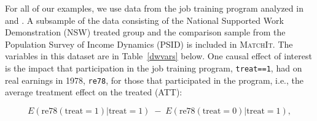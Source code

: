 \documentclass[oneside,letterpaper,titlepage]{article}
\newcommand{\MatchIt}{\textsc{MatchIt}}
\begin{document}
For all of our examples, we use data from the job training program
analyzed in \citet{lalonde86} and \citet{DehWah99}.  A subsample of
the data consisting of the National Supported Work Demonstration (NSW)
treated group and the comparison sample from the Population Survey of
Income Dynamics (PSID) is included in \MatchIt.%
The variables in this dataset are in Table~\ref{dwvars} below.  One
causal effect of interest is the impact that participation in the job
training program, \texttt{treat==1}, had on real earnings in 1978,
\texttt{re78}, for those that participated in the program, i.e., the
average treatment effect on the treated (ATT):

\begin{equation}\label{re78eqn}
E(\text{re78}(\text{treat}=1) | \text{treat}=1)\; - \; E(\text{re78}(\text{treat}=0) | \text{treat}=1),
\end{equation}
\end{document}
